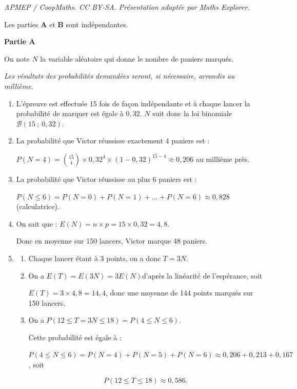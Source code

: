 \documentclass[10pt]{article}
\begin{document}
\noindent\textit{APMEP / CoopMaths. CC BY-SA. Présentation adaptée par Maths Explorer.}\par\medskip
\medskip



Les parties \textbf{A} et \textbf{B} sont indépendantes.

\bigskip

\textbf{Partie A}

\medskip






On note $N$ la variable aléatoire qui donne le nombre de paniers marqués.

\medskip

\emph{Les résultats des probabilités demandées seront, si nécessaire, arrondis au millième.}

\begin{enumerate}
\item 
L'épreuve est effectuée 15 fois de façon indépendante et à chaque lancer la probabilité de marquer est égale à $0,32$. $N$ suit donc la loi binomiale $\mathcal{B}(15~;~0,32)$.
\item 
La probabilité que Victor réussisse exactement 4 paniers est :

$P(N = 4) = \displaystyle \binom{15}{4}\times 0,32^4 \times (1 - 0,32)^{15-4} \approx 0,206$ au millième près.
\item 
La probabilité que Victor réussisse au plus 6 paniers est :

$P(N \leqslant 6) = P(N=0) + P(N = 1) + \ldots + P(N = 6) \approx 0,828$ (calculatrice).
\item 
On sait que : $E(N) = n \times p = 15 \times 0,32 = 4,8$.

Donc en moyenne sur 150 lancers, Victor marque 48 paniers.
\item 
	\begin{enumerate}
		\item 
Chaque lancer étant à 3 points, on a donc $T = 3N$.
		\item 
On a $E(T) = E (3N) = 3E(N)$\quad d'après la linéarité de l'espérance, soit

$E(T) = 3 \times 4,8 = 14,4$, donc une moyenne de 144 points marqués sur 150 lancers.
		\item 
On a $P(12 \leqslant T = 3N \leqslant 18) = P(4 \leqslant N \leqslant 6)$.

Cette probabilité est égale à :

$P(4 \leqslant N \leqslant 6) = P(N=4) + P(N=5) + P(N = 6) \approx 0,206 + 0,213 + 0,167$, soit

\[P(12 \leqslant T \leqslant 18) \approx 0,586.\]
	\end{enumerate}
\end{enumerate}
\end{document}
